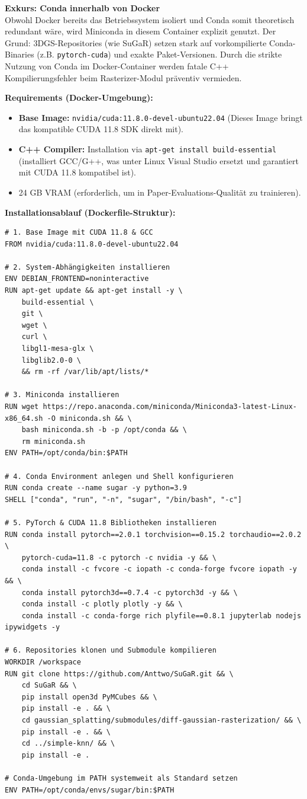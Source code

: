 \documentclass[12pt,a4paper]{article}
\begin{document}
\textbf{Exkurs: Conda innerhalb von Docker}\\
Obwohl Docker bereits das Betriebssystem isoliert und Conda somit theoretisch redundant wäre, wird Miniconda in diesem Container explizit genutzt. Der Grund: 3DGS-Repositories (wie SuGaR) setzen stark auf vorkompilierte Conda-Binaries (z.B. \texttt{pytorch-cuda}) und exakte Paket-Versionen. Durch die strikte Nutzung von Conda im Docker-Container werden fatale C++ Kompilierungsfehler beim Rasterizer-Modul präventiv vermieden.

\textbf{Requirements (Docker-Umgebung):}
\begin{itemize}[noitemsep]
    \item \textbf{Base Image:} \texttt{nvidia/cuda:11.8.0-devel-ubuntu22.04} (Dieses Image bringt das kompatible CUDA 11.8 SDK direkt mit).
    \item \textbf{C++ Compiler:} Installation via \texttt{apt-get install build-essential} (installiert GCC/G++, was unter Linux Visual Studio ersetzt und garantiert mit CUDA 11.8 kompatibel ist).
    \item 24 GB VRAM (erforderlich, um in Paper-Evaluations-Qualität zu trainieren).
\end{itemize}

\textbf{Installationsablauf (Dockerfile-Struktur):}
\begin{verbatim}
# 1. Base Image mit CUDA 11.8 & GCC
FROM nvidia/cuda:11.8.0-devel-ubuntu22.04

# 2. System-Abhängigkeiten installieren
ENV DEBIAN_FRONTEND=noninteractive
RUN apt-get update && apt-get install -y \
    build-essential \
    git \
    wget \
    curl \
    libgl1-mesa-glx \
    libglib2.0-0 \
    && rm -rf /var/lib/apt/lists/*

# 3. Miniconda installieren
RUN wget https://repo.anaconda.com/miniconda/Miniconda3-latest-Linux-x86_64.sh -O miniconda.sh && \
    bash miniconda.sh -b -p /opt/conda && \
    rm miniconda.sh
ENV PATH=/opt/conda/bin:$PATH

# 4. Conda Environment anlegen und Shell konfigurieren
RUN conda create --name sugar -y python=3.9
SHELL ["conda", "run", "-n", "sugar", "/bin/bash", "-c"]

# 5. PyTorch & CUDA 11.8 Bibliotheken installieren
RUN conda install pytorch==2.0.1 torchvision==0.15.2 torchaudio==2.0.2 \
    pytorch-cuda=11.8 -c pytorch -c nvidia -y && \
    conda install -c fvcore -c iopath -c conda-forge fvcore iopath -y && \
    conda install pytorch3d==0.7.4 -c pytorch3d -y && \
    conda install -c plotly plotly -y && \
    conda install -c conda-forge rich plyfile==0.8.1 jupyterlab nodejs ipywidgets -y

# 6. Repositories klonen und Submodule kompilieren
WORKDIR /workspace
RUN git clone https://github.com/Anttwo/SuGaR.git && \
    cd SuGaR && \
    pip install open3d PyMCubes && \
    pip install -e . && \
    cd gaussian_splatting/submodules/diff-gaussian-rasterization/ && \
    pip install -e . && \
    cd ../simple-knn/ && \
    pip install -e .

# Conda-Umgebung im PATH systemweit als Standard setzen
ENV PATH=/opt/conda/envs/sugar/bin:$PATH
\end{verbatim}
\end{document}

